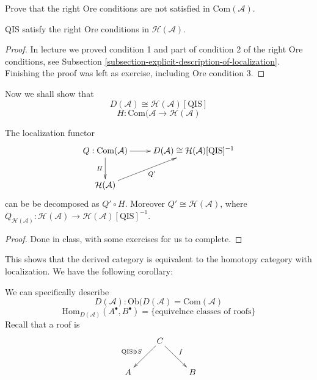 \begin{exercise}
\label{exercise-right-Ore-conditions-not-in-Com}
Prove that the right Ore conditions are not satisfied in
$\text{Com}(\mathcal{A})$.
\end{exercise}

\begin{proposition}
\label{proposition-QIS-satisfy-right-Ore-conditions-in-homotopy-category}
QIS satisfy the right Ore conditions in $\mathcal{H}(\mathcal{A})$.
\end{proposition}

\begin{proof}
In lecture we proved condition 1 and part of condition 2 of the right Ore
conditions, see Subsection
\ref{subsection-explicit-description-of-localization}. Finishing the proof was
left as exercise, including Ore condition 3.
\end{proof}

\bigskip\noindent
Now we shall show that
$$
D(\mathcal{A})\cong \mathcal{H}(\mathcal{A})[\text{QIS}]
$$
$$
H:\text{Com}(\mathcal{A}\to \mathcal{H}(\mathcal{A})
$$
\begin{proposition}
\label{proposition-localization-functor}
The localization functor
$$
\xymatrix{
Q:\text{Com}(\mathcal{A})\ar[d]_H\ar[r]
& D(\mathcal{A})\cong\mathcal{H}(\mathcal{A})[\text{QIS}]^{-1}\\
\mathcal{H}(\mathcal{A})\ar[ur]_{Q'}
}
$$
can be be decomposed as $Q' \circ H$. Moreover $Q' \cong
\mathcal{H}(\mathcal{A})$, where
$Q_{\mathcal{H}(\mathcal{A})}:\mathcal{H}(\mathcal{A}) \to
\mathcal{H}(\mathcal{A})[\text{QIS}]^{-1}$.
\end{proposition}

\begin{proof}
Done in class, with some exercises for us to complete.
\end{proof}

This shows that the derived category is equivalent to the homotopy category with
localization. We have the following corollary:

\begin{lemma}
\label{lemma-}
We can specifically describe
$$
D(\mathcal{A}): \text{Ob}(D(\mathcal{A}) = \text{Com}(\mathcal{A})
$$
$$
\text{Hom}_{D(\mathcal{A})}(A^{\bullet},B^{\bullet})
=\{\text{equivelnce classes of roofs}\}
$$
Recall that a roof is
$$
\xymatrix{
& C\ar[dl]_{\text{QIS}\ni S}\ar[dr]^{f}\\
A& & B
}
$$
\end{lemma}

